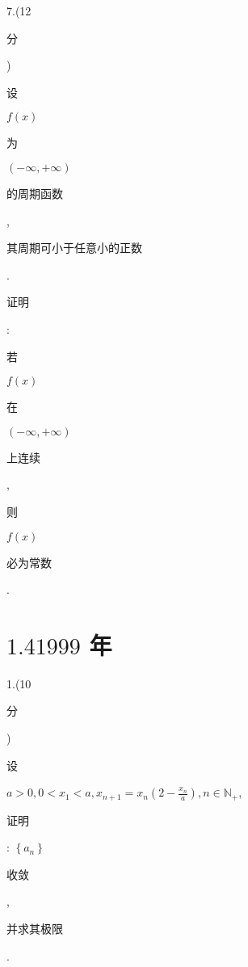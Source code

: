 \documentclass[10pt]{article}
\begin{document}
7.(12 \begin{CJK}{UTF8}{mj}分\end{CJK}) \begin{CJK}{UTF8}{mj}设\end{CJK} $f(x)$ \begin{CJK}{UTF8}{mj}为\end{CJK} $(-\infty,+\infty)$ \begin{CJK}{UTF8}{mj}的周期函数\end{CJK}, \begin{CJK}{UTF8}{mj}其周期可小于任意小的正数\end{CJK}. \begin{CJK}{UTF8}{mj}证明\end{CJK}: \begin{CJK}{UTF8}{mj}若\end{CJK} $f(x)$ \begin{CJK}{UTF8}{mj}在\end{CJK} $(-\infty,+\infty)$ \begin{CJK}{UTF8}{mj}上连续\end{CJK}, \begin{CJK}{UTF8}{mj}则\end{CJK} $f(x)$ \begin{CJK}{UTF8}{mj}必为常数\end{CJK}.

\section{$1.41999$ 年}
1.(10 \begin{CJK}{UTF8}{mj}分\end{CJK}) \begin{CJK}{UTF8}{mj}设\end{CJK} $a>0,0<x_{1}<a, x_{n+1}=x_{n}\left(2-\frac{x_{n}}{a}\right), n \in \mathbb{N}_{+}$, \begin{CJK}{UTF8}{mj}证明\end{CJK}: $\left\{a_{n}\right\}$ \begin{CJK}{UTF8}{mj}收敛\end{CJK}, \begin{CJK}{UTF8}{mj}并求其极限\end{CJK}.
\end{document}
